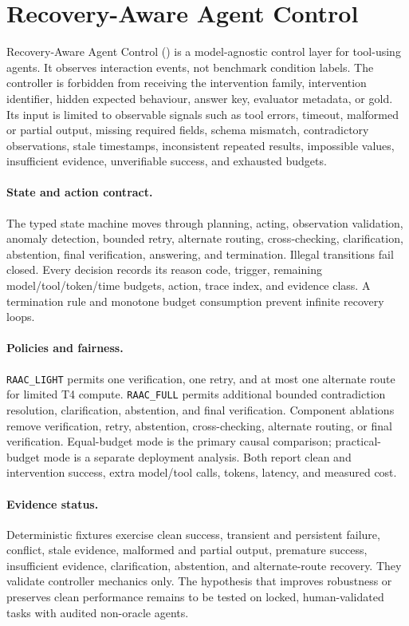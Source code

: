 \section{Recovery-Aware Agent Control}

Recovery-Aware Agent Control (\RAAC) is a model-agnostic control layer for
tool-using agents. It observes interaction events, not benchmark condition
labels. The controller is forbidden from receiving the intervention family,
intervention identifier, hidden expected behaviour, answer key, evaluator
metadata, or gold. Its input is limited to observable signals such as tool
errors, timeout, malformed or partial output, missing required fields, schema
mismatch, contradictory observations, stale timestamps, inconsistent repeated
results, impossible values, insufficient evidence, unverifiable success, and
exhausted budgets.

\paragraph{State and action contract.}
The typed state machine moves through planning, acting, observation validation,
anomaly detection, bounded retry, alternate routing, cross-checking,
clarification, abstention, final verification, answering, and termination.
Illegal transitions fail closed. Every decision records its reason code,
trigger, remaining model/tool/token/time budgets, action, trace index, and
evidence class. A termination rule and monotone budget consumption prevent
infinite recovery loops.

\paragraph{Policies and fairness.}
\texttt{RAAC\_LIGHT} permits one verification, one retry, and at most one
alternate route for limited T4 compute. \texttt{RAAC\_FULL} permits additional
bounded contradiction resolution, clarification, abstention, and final
verification. Component ablations remove verification, retry, abstention,
cross-checking, alternate routing, or final verification. Equal-budget mode is
the primary causal comparison; practical-budget mode is a separate deployment
analysis. Both report clean and intervention success, extra model/tool calls,
tokens, latency, and measured cost.

\paragraph{Evidence status.}
Deterministic fixtures exercise clean success, transient and persistent failure,
conflict, stale evidence, malformed and partial output, premature success,
insufficient evidence, clarification, abstention, and alternate-route recovery.
They validate controller mechanics only. The hypothesis that \RAAC improves
robustness or preserves clean performance remains to be tested on locked,
human-validated tasks with audited non-oracle agents.

